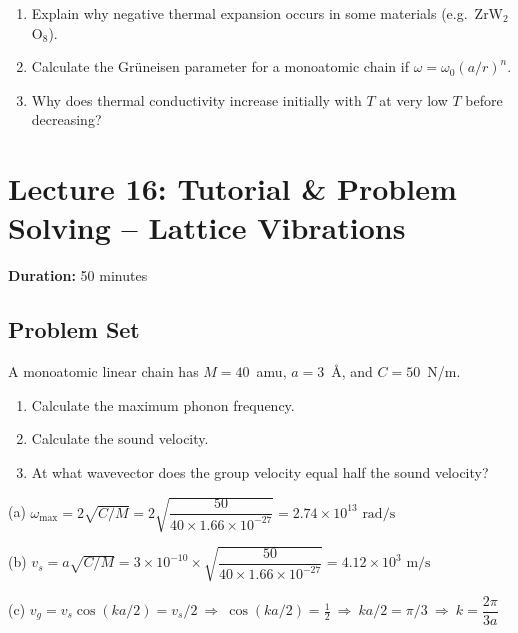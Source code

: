 \documentclass[11pt,a4paper]{article}
\begin{document}
\begin{probbox}
\begin{enumerate}
\item Explain why negative thermal expansion occurs in some materials (e.g.\
ZrW$_2$O$_8$).
\item Calculate the Gr\"uneisen parameter for a monoatomic chain if
$\omega=\omega_0(a/r)^n$.
\item Why does thermal conductivity increase initially with $T$ at very low $T$
before decreasing?
\end{enumerate}
\end{probbox}

\newpage
\section{Lecture 16: Tutorial \& Problem Solving -- Lattice Vibrations}
\noindent\textbf{Duration:} 50 minutes\par\vspace{6pt}

\subsection*{Problem Set}

\begin{probbox}[Problem 1]
A monoatomic linear chain has $M=40$~amu, $a=3$~\AA, and $C=50$~N/m.
\begin{enumerate}[label=(\alph*)]
\item Calculate the maximum phonon frequency.
\item Calculate the sound velocity.
\item At what wavevector does the group velocity equal half the sound velocity?
\end{enumerate}
\end{probbox}

\begin{solbox}
(a) $\displaystyle \omega_{\max}=2\sqrt{C/M}=2\sqrt{\dfrac{50}{40\times1.66\times10^{-27}}} = 2.74\times10^{13}\text{ rad/s}$

(b) $\displaystyle v_s=a\sqrt{C/M}=3\times10^{-10}\times\sqrt{\dfrac{50}{40\times1.66\times10^{-27}}} = 4.12\times10^{3}\text{ m/s}$

(c) $\displaystyle v_g=v_s\cos(ka/2)=v_s/2 \ \Rightarrow\ \cos(ka/2)=\tfrac12 \ \Rightarrow\ ka/2=\pi/3 \ \Rightarrow\ k=\dfrac{2\pi}{3a}$
\end{solbox}
\end{document}

